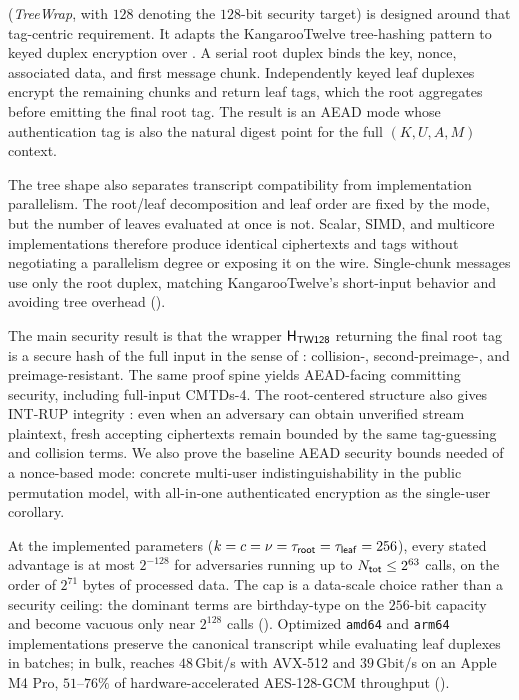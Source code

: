 \TW{} (\emph{TreeWrap}, with $128$ denoting the $128$-bit security target) is
designed around that tag-centric requirement. It adapts the KangarooTwelve
\cite{BDPVVV16} tree-hashing pattern to keyed duplex encryption over
\Keccakp{}. A serial root duplex binds the key, nonce, associated data, and
first message chunk. Independently keyed leaf duplexes encrypt the remaining
chunks and return leaf tags, which the root aggregates before emitting the
final root tag. The result is an AEAD mode whose authentication tag is also the
natural digest point for the full $(K, U, A, M)$ context.

The tree shape also separates transcript compatibility from implementation
parallelism. The root/leaf decomposition and leaf order are fixed by the mode,
but the number of leaves evaluated at once is not. Scalar, SIMD, and multicore
implementations therefore produce identical ciphertexts and tags without
negotiating a parallelism degree or exposing it on the wire. Single-chunk
messages use only the root duplex, matching KangarooTwelve's short-input
behavior and avoiding tree overhead ().

The main security result is that the wrapper $\mathsf{H}_{\mathsf{TW128}}$ returning the final root tag
is a secure hash of the full input in the sense of \cite{RS04}: collision-,
second-preimage-, and preimage-resistant. The same proof spine yields
AEAD-facing committing security, including full-input \textsf{CMTDs-4}. The
root-centered structure also gives \textsf{INT-RUP} integrity
\cite{ABLMMY14}: even when an adversary can obtain unverified stream plaintext,
fresh accepting ciphertexts remain bounded by the same tag-guessing and
collision terms. We also prove the baseline AEAD security bounds needed of a
nonce-based mode: concrete multi-user indistinguishability \cite{BT16} in the
public permutation model, with all-in-one authenticated encryption \cite{RS06}
as the single-user corollary.

At the implemented parameters
($k = c = \nu = \tau_{\mathsf{root}} = \tau_{\mathsf{leaf}} = 256$), every stated advantage is at most
$2^{-128}$ for adversaries running up to $N_{\mathsf{tot}} \leq 2^{63}$ \Keccakp{} calls,
on the order of $2^{71}$ bytes of processed data. The cap is a data-scale
choice rather than a security ceiling: the dominant terms are birthday-type on
the $256$-bit capacity and become vacuous only near $2^{128}$ calls
(). Optimized \texttt{amd64} and \texttt{arm64}
implementations preserve the canonical transcript while evaluating leaf duplexes
in batches; in bulk, \TW{} reaches $48$\,Gbit/s with AVX-512 and
$39$\,Gbit/s on an Apple M4 Pro, $51$--$76\%$ of hardware-accelerated
AES-128-GCM throughput ().

